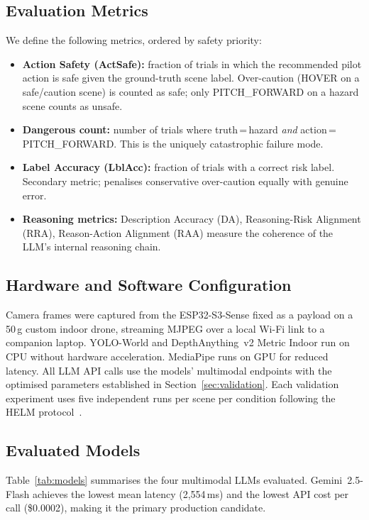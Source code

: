 \documentclass[journal]{IEEEtran}
\begin{document}
\subsection{Evaluation Metrics}

We define the following metrics, ordered by safety priority:
\begin{itemize}
  \item \textbf{Action Safety (ActSafe):} fraction of trials in which the
        recommended pilot action is safe given the ground-truth scene label.
        Over-caution (HOVER on a safe/caution scene) is counted as safe;
        only PITCH\_FORWARD on a hazard scene counts as unsafe.
  \item \textbf{Dangerous count:} number of trials where truth\,=\,hazard
        \emph{and} action\,=\,PITCH\_FORWARD. This is the uniquely
        catastrophic failure mode.
  \item \textbf{Label Accuracy (LblAcc):} fraction of trials with a correct
        risk label. Secondary metric; penalises conservative over-caution
        equally with genuine error.
  \item \textbf{Reasoning metrics:} Description Accuracy (DA),
        Reasoning-Risk Alignment (RRA), Reason-Action Alignment (RAA)
        measure the coherence of the LLM's internal reasoning chain.
\end{itemize}

\subsection{Hardware and Software Configuration}

Camera frames were captured from the ESP32-S3-Sense fixed as a payload on
a 50\,g custom indoor drone, streaming MJPEG over a local Wi-Fi link to
a companion laptop.
YOLO-World and DepthAnything~v2 Metric Indoor run on CPU without hardware
acceleration.
MediaPipe runs on GPU for reduced latency.
All LLM API calls use the models' multimodal endpoints with the
optimised parameters established in Section~\ref{sec:validation}.
Each validation experiment uses five independent runs per scene per
condition following the HELM protocol~\cite{liang2023helm}.

\subsection{Evaluated Models}

Table~\ref{tab:models} summarises the four multimodal LLMs evaluated.
Gemini~2.5-Flash achieves the lowest mean latency (2,554\,ms) and the
lowest API cost per call (\$0.0002), making it the primary production
candidate.
\end{document}
